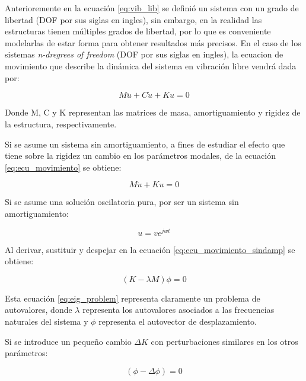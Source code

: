 Anterioremente en la ecuación \ref{eq:vib_lib} se definió un sistema con un grado de libertad (DOF por sus siglas en ingles), sin embargo, en la realidad las estructuras tienen múltiples grados de libertad, por lo que es conveniente modelarlas de estar forma para obtener resultados más precisos. En el caso de los sistemas \textit{n-dregrees of freedom} (DOF por sus siglas en ingles), la ecuacion de movimiento que describe la dinámica del sistema en vibración libre vendrá dada por:

\begin{equation} \label{eq:ecu_movimiento}
    M\ddot{u} + C\dot{u} + Ku = 0
\end{equation}

Donde M, C y K representan las matrices de masa, amortiguamiento y rigidez de la estructura, respectivamente.

Si se asume un sistema sin amortiguamiento, a fines de estudiar el efecto que tiene sobre la rigidez un cambio en los parámetros modales,  de la ecuación \ref{eq:ecu_movimiento} se obtiene: 

\begin{equation} \label{eq:ecu_movimiento_sindamp}
    M\ddot{u} + Ku = 0
\end{equation}

Si se asume una solución oscilatoria pura, por ser un sistema sin amortiguamiento:

\begin{equation} \label{eq:sol_ecu_motion}
    u = ve^{jwt}
\end{equation}

Al derivar, sustituir y despejar en la ecuación \ref{eq:ecu_movimiento_sindamp} se obtiene:

\begin{equation} \label{eq:eig_problem}
    (K - \lambda M)\phi = 0
\end{equation}

Esta ecuación \ref{eq:eig_problem} representa claramente un problema de autovalores, donde $\lambda$ representa los autovalores asociados a las frecuencias naturales del sistema y $\phi$ representa el autovector de desplazamiento.

Si se introduce un pequeño cambio $\Delta K$ con perturbaciones similares en los otros parámetros:

\begin{equation}
    [(K - \Delta K) - (\lambda - \Delta\lambda)(M - \Delta M)](\phi - \Delta\phi) = 0
\end{equation}

